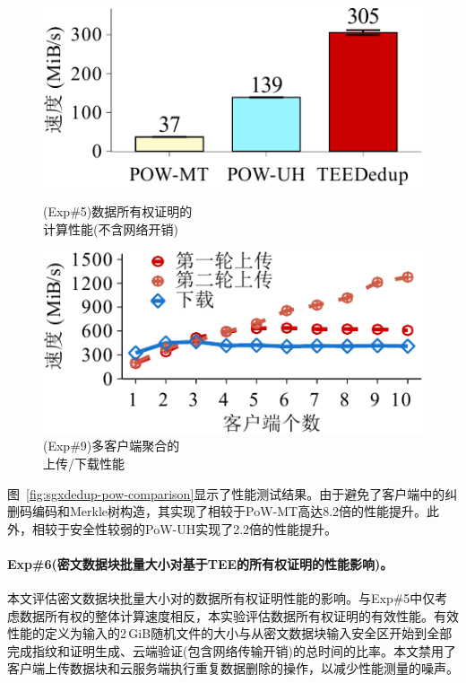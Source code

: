 \begin{figure}[!htb]
  \begin{minipage}[t]{0.47\textwidth}
    \centering
    \includegraphics[width=\linewidth]{pic/sgxdedup/plot/exp_a4/expa4_powPerformance.pdf}
    \caption{\small(Exp\#5)数据所有权证明的\\计算性能(不含网络开销)}
    \label{fig:sgxdedup-pow-comparison}
  \end{minipage}%
  \hspace{0.2in}
  \begin{minipage}[t]{0.47\textwidth}
    \centering
    \includegraphics[width=\linewidth]{pic/sgxdedup/plot/exp_b1/expb1_multiple_client.pdf}
    \caption{(Exp\#9)多客户端聚合的\\上传/下载性能}
    \label{fig:sgxdedup-multiClientThroughput}
  \end{minipage}%
\end{figure}

图~\ref{fig:sgxdedup-pow-comparison}显示了性能测试结果。由于\sysnameS 避免了客户端中的纠删码编码和Merkle树构造，其实现了相较于PoW-MT高达8.2倍的性能提升。此外，\sysnameS 相较于安全性较弱的PoW-UH实现了2.2倍的性能提升。

\paragraph*{Exp\#6(密文数据块批量大小对基于TEE的所有权证明的性能影响)。}本文评估密文数据块批量大小对\sysnameS 的数据所有权证明性能的影响。与Exp\#5中仅考虑数据所有权的整体计算速度相反，本实验评估数据所有权证明的有效性能。有效性能的定义为输入的2\,GiB随机文件的大小与从密文数据块输入安全区开始到全部完成指纹和证明生成、云端验证(包含网络传输开销)的总时间的比率。本文禁用了客户端上传数据块和云服务端执行重复数据删除的操作，以减少性能测量的噪声。

